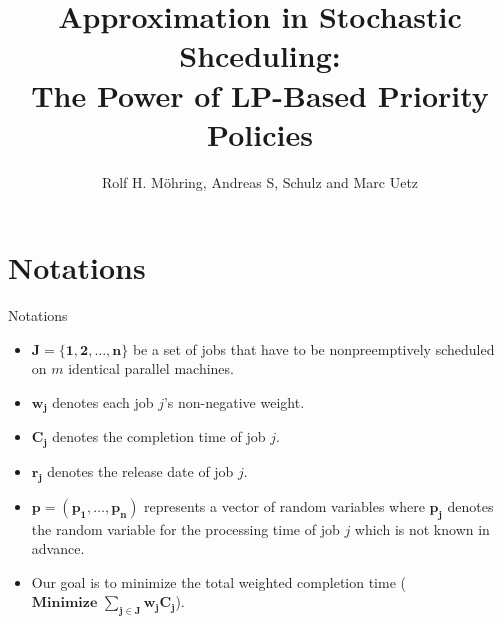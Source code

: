 \documentclass{beamer}
\title[Your Short Title]{Approximation in Stochastic Shceduling:\\The Power of LP-Based Priority Policies}
\author{Rolf H. M\"{o}hring, Andreas S, Schulz and Marc Uetz}
\institute{Slides: Geonsik Yu}
\begin{document}
\begin{frame}
  \titlepage
\end{frame}


\section{Notations}
\begin{frame}{Notations}
    \begin{itemize}
        \justifying
        \item $\pmb{J=\{1,2,\dots,n\}}$ be a set of jobs that have to be nonpreemptively scheduled on $m$ identical parallel machines.
        \vspace{0.2cm}
        \item $\pmb{w_j}$ denotes each job $j$'s non-negative weight.
        \vspace{0.2cm}        
        \item $\pmb{C_j}$ denotes the completion time of job $j$.
        \vspace{0.2cm}
        \item $\pmb{r_j}$ denotes the release date of job $j$.
        \vspace{0.2cm}
        \item $\pmb{p=(p_1,\dots,p_n)}$ represents a vector of random variables where $\pmb{p_j}$ denotes the random variable for the processing time of job $j$ which is not known in advance.
        \vspace{0.2cm}
        \item Our goal is to minimize the total weighted completion time ($\pmb{\text{Minimize }\sum\limits_{j\in J}w_jC_j}$).
    \end{itemize}
\end{frame}
\end{document}
